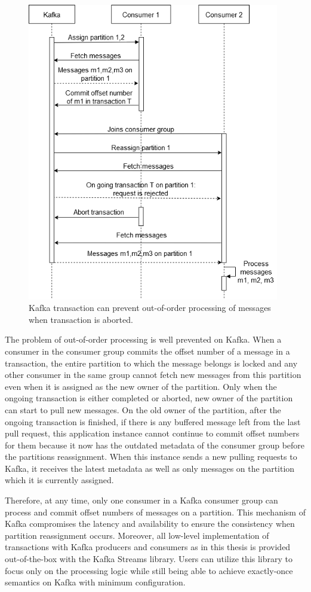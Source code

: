 \begin{figure}[h]
	\centering
	\includegraphics[width=11cm]{images/kafka-transaction-abort.png}
	\caption{Kafka transaction can prevent out-of-order processing of messages when transaction is aborted.}
	\label{fig:kafkatransactionabort}
\end{figure}
The problem of out-of-order processing is well prevented on Kafka. When a consumer in the consumer group commits the offset number of a message in a transaction, the entire partition to which the message belongs is locked and any other consumer in the same group cannot fetch new messages from this partition even when it is assigned as the new owner of the partition. Only when the ongoing transaction is either completed or aborted, new owner of the partition can start to pull new messages. On the old owner of the partition, after the ongoing transaction is finished, if there is any buffered message left from the last pull request, this application instance cannot continue to commit offset numbers for them because it now has the outdated metadata of the consumer group before the partitions reassignment. When this instance sends a new pulling requests to Kafka, it receives the latest metadata as well as only messages on the partition which it is currently assigned.

Therefore, at any time, only one consumer in a Kafka consumer group can process and commit offset numbers of messages on a partition. This mechanism of Kafka compromises the latency and availability to ensure the consistency when partition reassignment occurs. Moreover, all low-level implementation of transactions with Kafka producers and consumers as in this thesis is provided out-of-the-box with the Kafka Streams library. Users can utilize this library to focus only on the processing logic while still being able to achieve exactly-once semantics on Kafka with minimum configuration.



